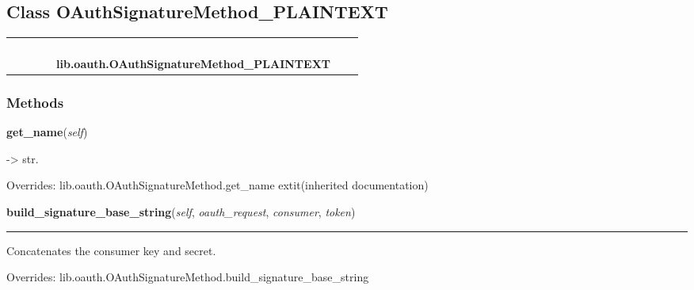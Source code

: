 \subsection{Class OAuthSignatureMethod\_PLAINTEXT}

    \label{lib:oauth:OAuthSignatureMethod_PLAINTEXT}
\begin{tabular}{cccccccc}
\multicolumn{2}{r}{\settowidth{\BCL}{object}\multirow{2}{\BCL}{object}}
&&
&&
  \\\cline{3-3}
  &&\multicolumn{1}{c|}{}
&&
&&
  \\
\multicolumn{4}{r}{\settowidth{\BCL}{lib.oauth.OAuthSignatureMethod}\multirow{2}{\BCL}{lib.oauth.OAuthSignatureMethod}}
&&
  \\\cline{5-5}
  &&&&\multicolumn{1}{c|}{}
&&
  \\
&&&&\multicolumn{2}{l}{\textbf{lib.oauth.OAuthSignatureMethod\_PLAINTEXT}}
\end{tabular}



  \subsubsection{Methods}

    \vspace{0.5ex}

\hspace{.8\funcindent}\begin{boxedminipage}{\funcwidth}

    \raggedright \textbf{get\_name}(\textit{self})

\setlength{\parskip}{2ex}
    -{\textgreater} str.

\setlength{\parskip}{1ex}
      Overrides: lib.oauth.OAuthSignatureMethod.get\_name 	extit{(inherited documentation)}

    \end{boxedminipage}

    \vspace{0.5ex}

\hspace{.8\funcindent}\begin{boxedminipage}{\funcwidth}

    \raggedright \textbf{build\_signature\_base\_string}(\textit{self}, \textit{oauth\_request}, \textit{consumer}, \textit{token})

    \vspace{-1.5ex}

    \rule{\textwidth}{0.5\fboxrule}
\setlength{\parskip}{2ex}
    Concatenates the consumer key and secret.

\setlength{\parskip}{1ex}
      Overrides: lib.oauth.OAuthSignatureMethod.build\_signature\_base\_string

    \end{boxedminipage}


